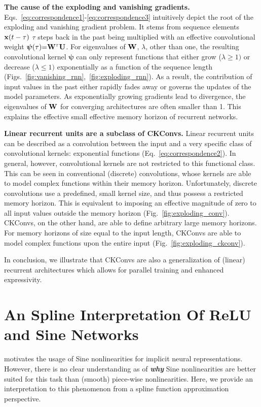 \documentclass{article}
\newcommand{\mat}[1]{\ensuremath{{\mathbf{\MakeUppercase{{#1}}}}}}
\renewcommand{\vec}[1]{\ensuremath{\mathbf{\MakeLowercase{{#1}}}}}
\newcommand{\Wm}{\mat{W}}
\newcommand{\Um}{\mat{U}}
\newcommand{\xv}{\vec{x}}
\begin{document}
\textbf{The cause of the exploding and vanishing gradients.} Eqs.~\ref{eq:correspondence1}-\ref{eq:correspondence3} intuitively depict the root of the exploding and vanishing gradient problem. It stems from sequence elements $\xv(t - \tau)$ $\tau$ steps back in the past being multiplied with an effective convolutional weight $\boldsymbol{\psi}(\tau) {=} \Wm^{\tau} \Um$. 
For eigenvalues of $\Wm$, $\lambda$, other than one, the resulting convolutional kernel $\boldsymbol{\psi}$ can only represent functions that either grow ($\lambda{\geq}1)$ or decrease ($\lambda{\leq}1)$ exponentially as a function of the sequence length (Figs.~\ref{fig:vanishing_rnn},~\ref{fig:exploding_rnn}).
As a result, the contribution of input values in the past either rapidly fades away or governs the updates of the model parameters. As exponentially growing gradients lead to divergence, the eigenvalues of $\Wm$ for converging architectures are often smaller than 1. This explains the effective small effective memory horizon of recurrent networks.

\textbf{Linear recurrent units are a subclass of CKConvs.} Linear recurrent units can be described as a convolution between the input and a very specific class of convolutional kernels: exponential functions (Eq.~\ref{eq:correspondence2}). In general, however, convolutional kernels are not restricted to this functional class. This can be seen in conventional (discrete) convolutions, whose kernels are able to model complex functions within their memory horizon. Unfortunately, discrete convolutions use a predefined, small kernel size, and thus possess a restricted memory horizon. This is equivalent to imposing an effective magnitude of zero to all input values outside the memory horizon (Fig.~\ref{fig:exploding_conv}). CKConvs, on the other hand, are able to define arbitrary large memory horizons. For memory horizons of size equal to the input length, CKConvs are able to model complex functions upon the entire input (Fig.~\ref{fig:exploding_ckconv}).

In conclusion, we illustrate that CKConvs are also a generalization of (linear) recurrent architectures which allows for parallel training and enhanced expressivity.

\section{An Spline Interpretation Of ReLU and Sine Networks}\label{appx:spline_interpretation}

\citet{sitzmann2020implicit} motivates the usage of Sine nonlinearities for implicit neural representations. However, there is no clear understanding as of \textbf{\textit{why}} Sine nonlinearities are better suited for this task than (smooth) piece-wise nonlinearities. Here, we provide an interpretation to this phenomenon from a spline function approximation perspective.
\end{document}
